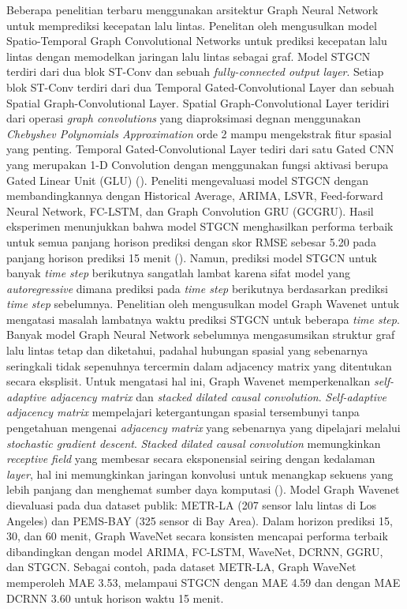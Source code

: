 Beberapa penelitian terbaru menggunakan arsitektur Graph Neural Network untuk memprediksi kecepatan lalu lintas. Penelitan oleh \cite{Yu2018} mengusulkan model Spatio-Temporal Graph Convolutional Networks untuk prediksi kecepatan lalu lintas dengan memodelkan jaringan lalu lintas sebagai graf. Model STGCN terdiri dari dua blok ST-Conv dan sebuah \textit{fully-connected output layer}. Setiap blok ST-Conv terdiri dari dua Temporal Gated-Convolutional Layer dan sebuah Spatial Graph-Convolutional Layer. Spatial Graph-Convolutional Layer teridiri dari operasi \textit{graph convolutions} yang diaproksimasi degnan menggunakan \textit{Chebyshev Polynomials Approximation} orde 2 mampu mengekstrak fitur spasial yang penting. Temporal Gated-Convolutional Layer tediri dari satu Gated CNN yang merupakan 1-D Convolution dengan menggunakan fungsi aktivasi berupa Gated Linear Unit (GLU) (\cite{Gehring2017}). Peneliti mengevaluasi model STGCN dengan membandingkannya dengan Historical Average, ARIMA, LSVR, Feed-forward Neural Network, FC-LSTM, dan Graph Convolution GRU (GCGRU). Hasil eksperimen menunjukkan bahwa model STGCN menghasilkan performa terbaik untuk semua panjang horison prediksi dengan skor RMSE sebesar 5.20 pada panjang horison prediksi 15 menit (\cite{Yu2018}). Namun, prediksi model STGCN untuk banyak \textit{time step} berikutnya sangatlah lambat karena sifat model yang \textit{autoregressive} dimana prediksi pada \textit{time step} berikutnya berdasarkan prediksi \textit{time step} sebelumnya. Penelitian oleh \cite{Wu2019} mengusulkan model Graph Wavenet untuk mengatasi masalah lambatnya waktu prediksi STGCN untuk beberapa \textit{time step}. Banyak model Graph Neural Network sebelumnya mengasumsikan struktur graf lalu lintas tetap dan diketahui, padahal hubungan spasial yang sebenarnya seringkali tidak sepenuhnya tercermin dalam adjacency matrix yang ditentukan secara eksplisit. Untuk mengatasi hal ini, Graph Wavenet memperkenalkan \textit{self-adaptive adjacency matrix} dan \textit{stacked dilated causal convolution}. \textit{Self-adaptive adjacency matrix} mempelajari ketergantungan spasial tersembunyi tanpa pengetahuan mengenai \textit{adjacency matrix} yang sebenarnya yang dipelajari melalui \textit{stochastic gradient descent}. \textit{Stacked dilated causal convolution} memungkinkan \textit{receptive field} yang membesar secara eksponensial seiring dengan kedalaman \textit{layer}, hal ini memungkinkan jaringan konvolusi untuk menangkap sekuens yang lebih panjang dan menghemat sumber daya komputasi (\cite{Wu2019}). Model Graph Wavenet dievaluasi pada dua dataset publik: METR-LA (207 sensor lalu lintas di Los Angeles) dan PEMS-BAY (325 sensor di Bay Area). Dalam horizon prediksi 15, 30, dan 60 menit, Graph WaveNet secara konsisten mencapai performa terbaik dibandingkan dengan model ARIMA, FC-LSTM, WaveNet, DCRNN, GGRU, dan STGCN. Sebagai contoh, pada dataset METR-LA, Graph WaveNet memperoleh MAE 3.53, melampaui STGCN dengan MAE 4.59 dan dengan MAE DCRNN 3.60 untuk horison waktu 15 menit.


